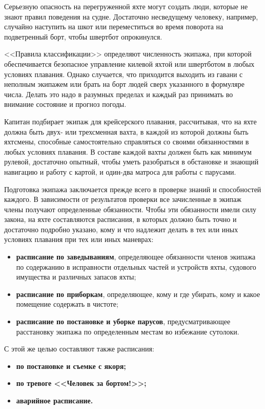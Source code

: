 \documentclass[a4paper, 12pt, twoside, final]{scrbook}
\begin{document}
Серьезную опасность на перегруженной яхте могут создать люди, которые не знают правил поведения на судне. Достаточно несведущему человеку, например, случайно наступить на шкот или переместиться во время поворота на подветренный борт, чтобы швертбот опрокинулся.

<<Правила классификации>> определяют численность экипажа, при которой обеспечивается безопасное управление килевой яхтой или швертботом в любых условиях плавания. Однако случается, что приходится выходить из гавани с неполным экипажем или брать на борт людей сверх указанного в формуляре числа. Делать это надо в разумных пределах и каждый раз принимать во внимание состояние и прогноз погоды.

Капитан подбирает экипаж для крейсерского плавания, рассчитывая, что на яхте должна быть двух- или трехсменная вахта, в каждой из которой должны быть яхтсмены, способные самостоятельно справляться со своими обязанностями в любых условиях плавания. В составе каждой вахты должен быть как минимум рулевой, достаточно опытный, чтобы уметь разобраться в обстановке и знающий навигацию и работу с картой, и один-два матроса для работы с парусами.

Подготовка экипажа заключается прежде всего в проверке знаний и способностей каждого. В зависимости от результатов проверки все зачисленные в экипаж члены получают определенные обязанности. Чтобы эти обязанности имели силу закона, на яхте составляются расписания, в которых должно быть точно и достаточно подробно указано, кому и что надлежит делать в тех или иных условиях плавания при тех или иных маневрах:

\begin{itemize}
\item \textbf{расписание по заведываниям}, определяющее обязанности членов экипажа по содержанию в исправности отдельных частей и устройств яхты, судового имущества и различных запасов яхты;
\item \textbf{расписание по приборкам}, определяющее, кому и где убирать, кому и какое помещение содержать в чистоте;
\item \textbf{расписание по постановке и уборке парусов}, предусматривающее расстановку экипажа по определенным местам во избежание сутолоки.
\end{itemize}

С этой же целью составляют также расписания:

\begin{itemize}
\item \textbf{по постановке и съемке с якоря;}
\item \textbf{по тревоге <<Человек за бортом!>>;}
\item \textbf{аварийное расписание.}
\end{itemize}
\end{document}
